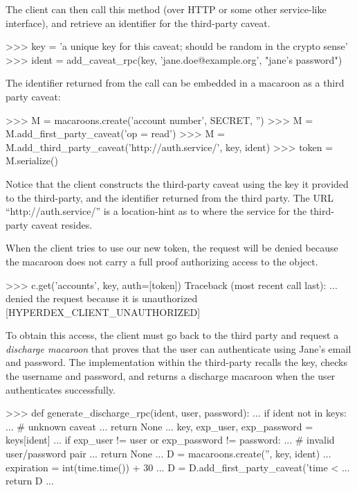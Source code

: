 The client can then call this method (over HTTP or some other service-like
interface), and retrieve an identifier for the third-party caveat.

\begin{pythoncode}
>>> key = 'a unique key for this caveat; should be random in the crypto sense'
>>> ident = add_caveat_rpc(key, 'jane.doe@example.org', "jane's password")
\end{pythoncode}

The identifier returned from the  call can be embedded in
a macaroon as a third party caveat:

\begin{pythoncode}
>>> M = macaroons.create('account number', SECRET, '')
>>> M = M.add_first_party_caveat('op = read')
>>> M = M.add_third_party_caveat('http://auth.service/', key, ident)
>>> token = M.serialize()
\end{pythoncode}

Notice that the client constructs the third-party caveat using the key it
provided to the third-party, and the identifier returned from the third party.
The URL ``http://auth.service/'' is a location-hint as to where the service for
the third-party caveat resides.

When the client tries to use our new token, the request will be denied because
the macaroon does not carry a full proof authorizing access to the object.

\begin{pythoncode}
>>> c.get('accounts', key, auth=[token])
Traceback (most recent call last):
... denied the request because it is unauthorized [HYPERDEX_CLIENT_UNAUTHORIZED]
\end{pythoncode}

To obtain this access, the client must go back to the third party and request a
{\em discharge macaroon} that proves that the user can authenticate using Jane's
email and password.  The implementation within the third-party recalls the key,
checks the username and password, and returns a discharge macaroon when the user
authenticates successfully.

\begin{pythoncode}
>>> def generate_discharge_rpc(ident, user, password):
...     if ident not in keys:
...         # unknown caveat
...         return None
...     key, exp_user, exp_password = keys[ident]
...     if exp_user != user or exp_password != password:
...         # invalid user/password pair
...         return None
...     D = macaroons.create('', key, ident)
...     expiration = int(time.time()) + 30
...     D = D.add_first_party_caveat('time < %
...     return D
...
\end{pythoncode}

